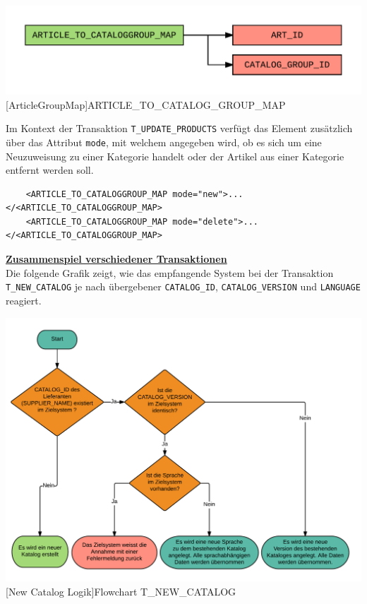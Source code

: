 	\begin{minipage}{\linewidth}
		\vspace{1em}
		\centering
		\includegraphics[width=0.7\linewidth]{img/articleGroupMap}
		[ArticleGroupMap]{ARTICLE\_TO\_CATALOG\_GROUP\_MAP}
		\label{fig:header}
		\vspace{1em}
	\end{minipage}
	
	Im Kontext der Transaktion \texttt{T\_UPDATE\_PRODUCTS} verfügt das Element zusätzlich über das Attribut \texttt{mode}, mit welchem angegeben wird, ob es sich um eine Neuzuweisung zu einer Kategorie handelt oder der Artikel aus einer Kategorie entfernt werden soll.
	
	\begin{lstlisting}
	<ARTICLE_TO_CATALOGGROUP_MAP mode="new">...</<ARTICLE_TO_CATALOGGROUP_MAP>
	<ARTICLE_TO_CATALOGGROUP_MAP mode="delete">...</<ARTICLE_TO_CATALOGGROUP_MAP>
	\end{lstlisting}
	
	
	\textbf{\underline{Zusammenspiel verschiedener Transaktionen}}\\
	
	Die folgende Grafik zeigt, wie das empfangende System bei der Transaktion \texttt{T\_NEW\_CATALOG} je nach übergebener \texttt{CATALOG\_ID}, \texttt{CATALOG\_VERSION} und \texttt{LANGUAGE} reagiert.
	
	\begin{minipage}{\linewidth}
		\vspace{1em}
		\centering
		\includegraphics[width=0.65\linewidth]{img/newCatalogLogik}
		[New Catalog Logik]{Flowchart T\_NEW\_CATALOG}
		\label{fig:header}
		\vspace{1em}
	\end{minipage}
	
